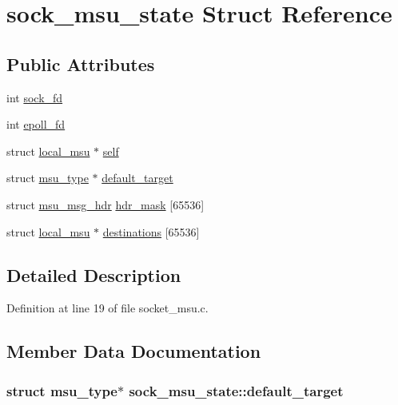 \hypertarget{structsock__msu__state}{\section{sock\-\_\-msu\-\_\-state Struct Reference}
\label{structsock__msu__state}
}
\subsection*{Public Attributes}
\begin{DoxyCompactItemize}
\item 
int \hyperlink{structsock__msu__state_a7621ea37a55e4419bd2e35da3be10ae3}{sock\-\_\-fd}
\item 
int \hyperlink{structsock__msu__state_ad759ccb29fb3de7b6dda139dbde0e825}{epoll\-\_\-fd}
\item 
struct \hyperlink{structlocal__msu}{local\-\_\-msu} $\ast$ \hyperlink{structsock__msu__state_a041ff140d8b0451b98418ea68dc4f62c}{self}
\item 
struct \hyperlink{structmsu__type}{msu\-\_\-type} $\ast$ \hyperlink{structsock__msu__state_a89ea075e5eae4953216654fa556522cb}{default\-\_\-target}
\item 
struct \hyperlink{structmsu__msg__hdr}{msu\-\_\-msg\-\_\-hdr} \hyperlink{structsock__msu__state_ab195dc5130a98fdf868543dc6e153fcb}{hdr\-\_\-mask} \mbox{[}65536\mbox{]}
\item 
struct \hyperlink{structlocal__msu}{local\-\_\-msu} $\ast$ \hyperlink{structsock__msu__state_a316dd9a4f75911daa33496088766b3da}{destinations} \mbox{[}65536\mbox{]}
\end{DoxyCompactItemize}


\subsection{Detailed Description}


Definition at line 19 of file socket\-\_\-msu.\-c.



\subsection{Member Data Documentation}
\hypertarget{structsock__msu__state_a89ea075e5eae4953216654fa556522cb}{
\subsubsection[{default\-\_\-target}]{\setlength{\rightskip}{0pt plus 5cm}struct {\bf msu\-\_\-type}$\ast$ sock\-\_\-msu\-\_\-state\-::default\-\_\-target}}\label{structsock__msu__state_a89ea075e5eae4953216654fa556522cb}


